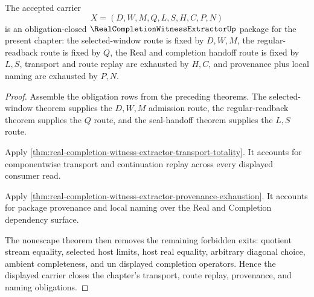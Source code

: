 \begin{theorem}
\label{thm:real-completion-witness-extractor-obligation-closure-package}
The accepted carrier
$$
X=(D,W,M,Q,L,S,H,C,P,N)
$$
is an obligation-closed $\RealCompletionWitnessExtractorUp$ package for the present chapter: the selected-window route is fixed by $D,W,M$, the regular-readback route is fixed by $Q$, the Real and completion handoff route is fixed by $L,S$, transport and route replay are exhausted by $H,C$, and provenance plus local naming are exhausted by $P,N$.
\end{theorem}
\begin{proof}
Assemble the obligation rows from the preceding theorems. The selected-window theorem supplies the $D,W,M$ admission route, the regular-readback theorem supplies the $Q$ route, and the seal-handoff theorem supplies the $L,S$ route.

Apply \autoref{thm:real-completion-witness-extractor-transport-totality}. It accounts for componentwise transport and continuation replay across every displayed consumer read.

Apply \autoref{thm:real-completion-witness-extractor-provenance-exhaustion}. It accounts for package provenance and local naming over the Real and Completion dependency surface.

The nonescape theorem then removes the remaining forbidden exits: quotient stream equality, selected host limits, host real equality, arbitrary diagonal choice, ambient completeness, and un displayed completion operators. Hence the displayed carrier closes the chapter's transport, route replay, provenance, and naming obligations.
\end{proof}

